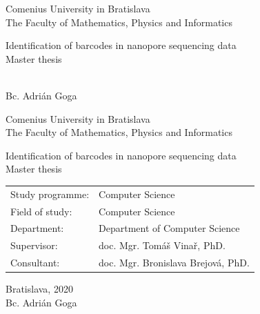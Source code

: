 \documentclass[12pt, twoside]{book}
\def\mfrok{2020}
\def\mfnazov{Identification of barcodes in nanopore sequencing data}
\def\mftyp{Master thesis}
\def\mfautor{Bc. Adri\'an Goga}
\def\mfskolitel{doc. Mgr. Tom\'a\v{s} Vina\v{r}, PhD.}
\def\mfkonzultant{doc. Mgr. Bronislava Brejov\'a, PhD. }
\def\mfmiesto{Bratislava, \mfrok}
\def\mfodbor{ Computer Science}
\def\program{ Computer Science }
\def\mfpracovisko{ Department of Computer Science }
\begin{document}
     
\frontmatter


\thispagestyle{empty}

\begin{center}
\sc\large
Comenius University in Bratislava\\
The Faculty of Mathematics, Physics and Informatics

\vfill

{\LARGE\mfnazov}\\
\mftyp
\end{center}

\vfill

{\sc\large 
\noindent \mfrok\\
\mfautor
}

\cleardoublepage


\thispagestyle{empty}
\noindent

\begin{center}
\sc  
\large
Comenius University in Bratislava\\
The Faculty of Mathematics, Physics and Informatics

\vfill

{\LARGE\mfnazov}\\
\mftyp
\end{center}

\vfill

\noindent
\begin{tabular}{ll}
Study programme: & \program \\
Field of study: & \mfodbor \\
Department: & \mfpracovisko \\
Supervisor: & \mfskolitel \\
Consultant: & \mfkonzultant \\
\end{tabular}

\vfill


\noindent \mfmiesto\\
\mfautor

\cleardoublepage


\end{document}

